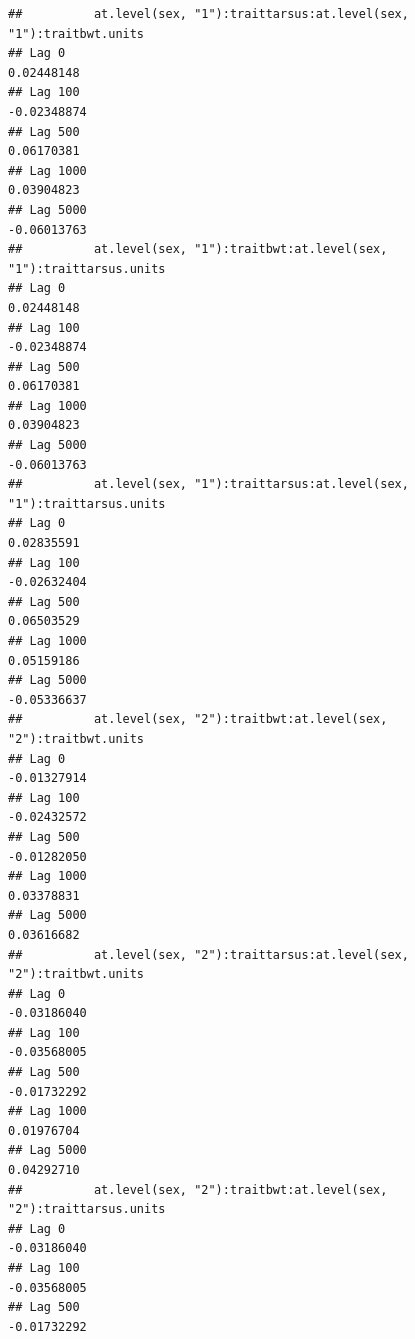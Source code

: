 \documentclass[
  12pt,
]{book}
\begin{document}
\begin{verbatim}
##          at.level(sex, "1"):traittarsus:at.level(sex, "1"):traitbwt.units
## Lag 0                                                          0.02448148
## Lag 100                                                       -0.02348874
## Lag 500                                                        0.06170381
## Lag 1000                                                       0.03904823
## Lag 5000                                                      -0.06013763
##          at.level(sex, "1"):traitbwt:at.level(sex, "1"):traittarsus.units
## Lag 0                                                          0.02448148
## Lag 100                                                       -0.02348874
## Lag 500                                                        0.06170381
## Lag 1000                                                       0.03904823
## Lag 5000                                                      -0.06013763
##          at.level(sex, "1"):traittarsus:at.level(sex, "1"):traittarsus.units
## Lag 0                                                             0.02835591
## Lag 100                                                          -0.02632404
## Lag 500                                                           0.06503529
## Lag 1000                                                          0.05159186
## Lag 5000                                                         -0.05336637
##          at.level(sex, "2"):traitbwt:at.level(sex, "2"):traitbwt.units
## Lag 0                                                      -0.01327914
## Lag 100                                                    -0.02432572
## Lag 500                                                    -0.01282050
## Lag 1000                                                    0.03378831
## Lag 5000                                                    0.03616682
##          at.level(sex, "2"):traittarsus:at.level(sex, "2"):traitbwt.units
## Lag 0                                                         -0.03186040
## Lag 100                                                       -0.03568005
## Lag 500                                                       -0.01732292
## Lag 1000                                                       0.01976704
## Lag 5000                                                       0.04292710
##          at.level(sex, "2"):traitbwt:at.level(sex, "2"):traittarsus.units
## Lag 0                                                         -0.03186040
## Lag 100                                                       -0.03568005
## Lag 500                                                       -0.01732292

\end{verbatim}
\end{document}
